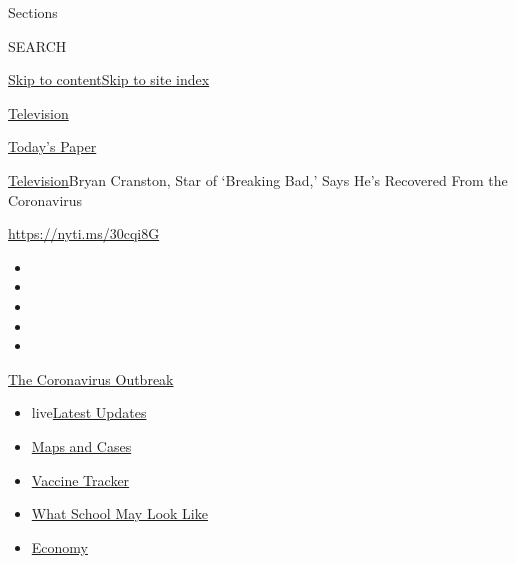 Sections

SEARCH

\protect\hyperlink{site-content}{Skip to
content}\protect\hyperlink{site-index}{Skip to site index}

\href{https://www.nytimes.com/section/arts/television}{Television}

\href{https://myaccount.nytimes.com/auth/login?response_type=cookie\&client_id=vi}{}

\href{https://www.nytimes.com/section/todayspaper}{Today's Paper}

\href{/section/arts/television}{Television}\textbar{}Bryan Cranston,
Star of `Breaking Bad,' Says He's Recovered From the Coronavirus

\url{https://nyti.ms/30cqi8G}

\begin{itemize}
\item
\item
\item
\item
\item
\end{itemize}

\href{https://www.nytimes.com/news-event/coronavirus?action=click\&pgtype=Article\&state=default\&region=TOP_BANNER\&context=storylines_menu}{The
Coronavirus Outbreak}

\begin{itemize}
\tightlist
\item
  live\href{https://www.nytimes.com/2020/08/01/world/coronavirus-covid-19.html?action=click\&pgtype=Article\&state=default\&region=TOP_BANNER\&context=storylines_menu}{Latest
  Updates}
\item
  \href{https://www.nytimes.com/interactive/2020/us/coronavirus-us-cases.html?action=click\&pgtype=Article\&state=default\&region=TOP_BANNER\&context=storylines_menu}{Maps
  and Cases}
\item
  \href{https://www.nytimes.com/interactive/2020/science/coronavirus-vaccine-tracker.html?action=click\&pgtype=Article\&state=default\&region=TOP_BANNER\&context=storylines_menu}{Vaccine
  Tracker}
\item
  \href{https://www.nytimes.com/interactive/2020/07/29/us/schools-reopening-coronavirus.html?action=click\&pgtype=Article\&state=default\&region=TOP_BANNER\&context=storylines_menu}{What
  School May Look Like}
\item
  \href{https://www.nytimes.com/live/2020/07/31/business/stock-market-today-coronavirus?action=click\&pgtype=Article\&state=default\&region=TOP_BANNER\&context=storylines_menu}{Economy}
\end{itemize}

